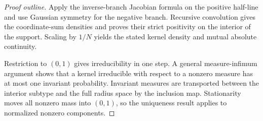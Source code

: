 \begin{proof}[Proof outline]
  \leanok
  Apply the inverse-branch Jacobian formula on the positive half-line and use
  Gaussian symmetry for the negative branch. Recursive convolution gives the
  coordinate-sum densities and proves their strict positivity on the interior
  of the support. Scaling by $1/N$ yields the stated kernel density and mutual
  absolute continuity.

  Restriction to $(0,1)$ gives irreducibility in one step. A general
  measure-infimum argument shows that a kernel irreducible with respect to a
  nonzero measure has at most one invariant probability. Invariant measures
  are transported between the interior subtype and the full radius space by
  the inclusion map. Stationarity moves all nonzero mass into $(0,1)$, so the
  uniqueness result applies to normalized nonzero components.
\end{proof}

